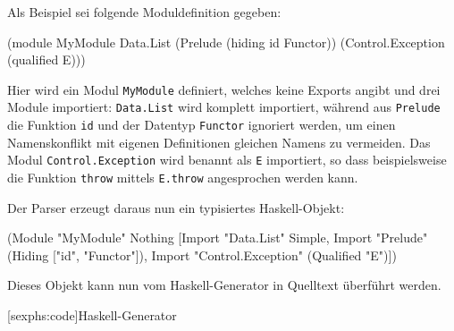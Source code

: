 \documentclass[12pt, a4paper, bibgerm]{scrbook}
\newenvironment{DIFnomarkup}{}{}
\newcommand\icode[1]{\lstinline?#1?}
\newcommand\lsection{}
\begin{document}
Als Beispiel sei folgende Moduldefinition gegeben:
\begin{DIFnomarkup}\begin{code}
(module MyModule
  Data.List
  (Prelude (hiding id Functor))
  (Control.Exception (qualified E)))
\end{code}\end{DIFnomarkup}
Hier wird ein Modul \icode{MyModule} definiert, welches keine Exports
angibt und drei Module importiert: \icode{Data.List} wird komplett
importiert, während aus \icode{Prelude} die Funktion \icode{id} und der
Datentyp \icode{Functor} ignoriert werden, um einen Namenskonflikt mit
eigenen Definitionen gleichen Namens zu vermeiden. Das Modul
\icode{Control.Exception} wird benannt als \icode{E} importiert, so dass
beispielsweise die Funktion \icode{throw} mittels \icode{E.throw}
angesprochen werden kann.

Der Parser erzeugt daraus nun ein typisiertes Haskell-Objekt:
\begin{DIFnomarkup}\begin{code}
(Module "MyModule"
         Nothing
         [Import "Data.List" Simple,
          Import "Prelude" (Hiding ["id", "Functor"]),
          Import "Control.Exception" (Qualified "E")])
\end{code}\end{DIFnomarkup}
Dieses Objekt kann nun vom Haskell-Generator in Quelltext überführt werden.

\lsection[sexphs:code]{Haskell-Generator}
\end{document}
